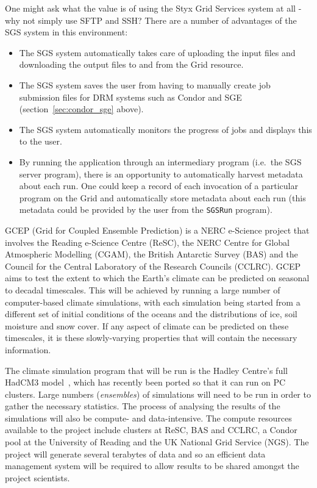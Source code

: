 \documentclass[times,10pt,twocolumn]{article}
\begin{document}
One might ask what the value is of using the Styx Grid Services system at all - why not simply use SFTP and SSH?  There are a number of advantages of the SGS system in this environment:

\begin{itemize}
\item The SGS system automatically takes care of uploading the input files and downloading the output files to and from the Grid resource.
\item The SGS system saves the user from having to manually create job submission files for DRM systems such as Condor and SGE (section~\ref{sec:condor_sge} above).
\item The SGS system automatically monitors the progress of jobs and displays this to the user.
\item By running the application through an intermediary program (i.e.\ the SGS server program), there is an opportunity to automatically harvest metadata about each run.  One could keep a record of each invocation of a particular program on the Grid and automatically store metadata about each run (this metadata could be provided by the user from the {\tt SGSRun} program).
\end{itemize}

GCEP (Grid for Coupled Ensemble Prediction) is a NERC e-Science project that involves the Reading e-Science Centre (ReSC), the NERC Centre for Global Atmospheric Modelling (CGAM), the British Antarctic Survey (BAS) and the Council for the Central Laboratory of the Research Councils (CCLRC).  GCEP aims to test the extent to which the Earth's climate can be predicted on seasonal to decadal timescales.  This will be achieved by running a large number of computer-based climate simulations, with each simulation being started from a different set of initial conditions of the oceans and the distributions of ice, soil moisture and snow cover.  If any aspect of climate can be predicted on these timescales, it is these slowly-varying properties that will contain the necessary information.

The climate simulation program that will be run is the Hadley Centre's full HadCM3 model~\cite{hadcm3}, which has recently been ported so that it can run on PC clusters.  Large numbers ({\em ensembles\/}) of simulations will need to be run in order to gather the necessary statistics.  The process of analysing the results of the simulations will also be compute- and data-intensive.  The compute resources available to the project include clusters at ReSC, BAS and CCLRC, a Condor pool at the University of Reading and the UK National Grid Service (NGS).  The project will generate several terabytes of data and so an efficient data management system will be required to allow results to be shared amongst the project scientists.
\end{document}
